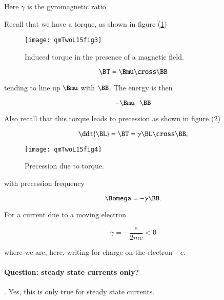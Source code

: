 Here $\gamma$ is the gyromagnetic ratio

Recall that we have a torque, as shown in figure (\ref{fig:qmTwoL15:qmTwoL15fig3})
\begin{figure}[htp]
   \centering
   \texttt{[image: qmTwoL15fig3]}
   \caption{Induced torque in the presence of a magnetic field.}\label{fig:qmTwoL15:qmTwoL15fig3}
\end{figure}

\begin{equation}\label{eqn:qmTwoL15:190}
\BT = \Bmu \cross \BB
\end{equation}

tending to line up $\Bmu$ with $\BB$.  The energy is then

\begin{equation}\label{eqn:qmTwoL15:210}
-\Bmu \cdot \BB
\end{equation}

Also recall that this torque leads to precession as shown in figure (\ref{fig:qmTwoL15:qmTwoL15fig4})

\begin{equation}\label{eqn:qmTwoL15:230}
\ddt{\BL} = \BT = \gamma \BL \cross \BB,
\end{equation}

\begin{figure}[htp]
   \centering
   \texttt{[image: qmTwoL15fig4]}
   \caption{Precession due to torque.}\label{fig:qmTwoL15:qmTwoL15fig4}
\end{figure}

with precession frequency 

\begin{equation}\label{eqn:qmTwoL15:250}
\Bomega = - \gamma \BB.
\end{equation}

For a current due to a moving electron

\begin{equation}\label{eqn:qmTwoL15:270}
\gamma = -\frac{e}{2 m c} < 0
\end{equation}

where we are, here, writing for charge on the electron $-e$.  

\paragraph{Question: steady state currents only?}.  Yes, this is only true for steady state currents.

